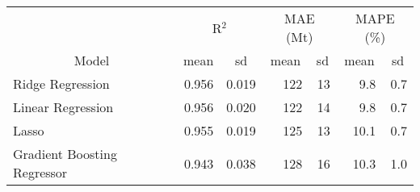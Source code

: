 
\begin{tabular}[t]{lrrrrrr}
\toprule
\multicolumn{1}{c}{ } & \multicolumn{2}{c}{R$^2$} & \multicolumn{2}{c}{MAE (Mt)} & \multicolumn{2}{c}{MAPE (\%)} \\
\cmidrule(l{3pt}r{3pt}){2-3} \cmidrule(l{3pt}r{3pt}){4-5} \cmidrule(l{3pt}r{3pt}){6-7}
\multicolumn{1}{c}{Model} & \multicolumn{1}{c}{mean} & \multicolumn{1}{c}{sd} & \multicolumn{1}{c}{mean} & \multicolumn{1}{c}{sd} & \multicolumn{1}{c}{mean} & \multicolumn{1}{c}{sd}\\
\midrule
Ridge Regression & 0.956 & 0.019 & 122 & 13 & 9.8 & 0.7\\
Linear Regression & 0.956 & 0.020 & 122 & 14 & 9.8 & 0.7\\
Lasso & 0.955 & 0.019 & 125 & 13 & 10.1 & 0.7\\
Gradient Boosting Regressor & 0.943 & 0.038 & 128 & 16 & 10.3 & 1.0\\
\bottomrule
\end{tabular}

